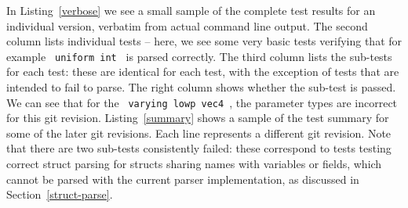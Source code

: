 \documentclass[12pt,twoside,notitlepage]{report}
\begin{document}
In Listing~\ref{verbose} we see a small sample of the complete test results for an individual version, verbatim from actual command line output. The second column lists individual tests -- here, we see some very basic tests verifying that for example \texttt{ uniform int } is parsed correctly. The third column lists the sub-tests for each test: these are identical for each test, with the exception of tests that are intended to fail to parse. The right column shows whether the sub-test is passed. We can see that for the \texttt{ varying lowp vec4 }, the parameter types are incorrect for this git revision. Listing~\ref{summary} shows a sample of the test summary for some of the later git revisions. Each line represents a different git revision. Note that there are two sub-tests consistently failed: these correspond to tests testing correct struct parsing for structs sharing names with variables or fields, which cannot be parsed with the current parser implementation, as discussed in Section~\ref{struct-parse}.
\end{document}
